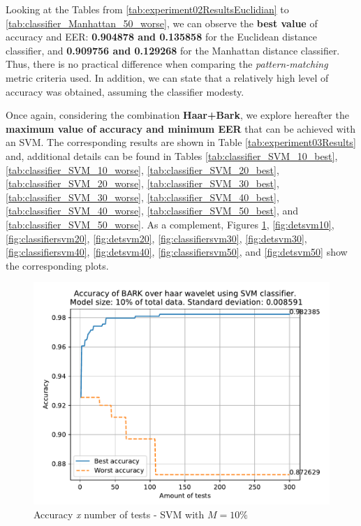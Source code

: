 \par Looking at the Tables from \ref{tab:experiment02ResultsEuclidian} to \ref{tab:classifier_Manhattan_50_worse}, we can observe the \textbf{best value} of accuracy and EER: \textbf{0.904878 and 0.135858} for the Euclidean distance classifier, and \textbf{0.909756 and 0.129268} for the Manhattan distance classifier. Thus, there is no practical difference when comparing the \textit{pattern-matching} metric criteria used. In addition, we can state that a relatively high level of accuracy was obtained, assuming the classifier modesty.
\\
\par Once again, considering the combination \textbf{Haar+Bark}, we explore hereafter the \textbf{maximum value of accuracy and minimum EER} that can be achieved with an SVM. The corresponding results are shown in Table \ref{tab:experiment03Results} and, additional details can be found in Tables \ref{tab:classifier_SVM_10_best}, \ref{tab:classifier_SVM_10_worse}, \ref{tab:classifier_SVM_20_best}, \ref{tab:classifier_SVM_20_worse}, \ref{tab:classifier_SVM_30_best}, \ref{tab:classifier_SVM_30_worse}, \ref{tab:classifier_SVM_40_best}, \ref{tab:classifier_SVM_40_worse}, \ref{tab:classifier_SVM_50_best}, and \ref{tab:classifier_SVM_50_worse}. As a complement, Figures \ref{fig:classifiersvm10}, \ref{fig:detsvm10}, \ref{fig:classifiersvm20}, \ref{fig:detsvm20}, \ref{fig:classifiersvm30}, \ref{fig:detsvm30}, \ref{fig:classifiersvm40}, \ref{fig:detsvm40}, \ref{fig:classifiersvm50}, and \ref{fig:detsvm50} show the corresponding plots.






	\begin{figure}[H]
		\centering
		\includegraphics[scale=.8]{images/results/confusionMatrices/classifier_SVM_10.pdf}
		\caption{Accuracy \textit{x} number of tests - SVM with $M=10\%$}
		\label{fig:classifiersvm10}
	\end{figure}
